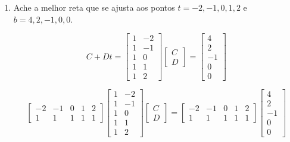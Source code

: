 \documentclass[leqno]{article}
\numberwithin{equation}{section}
\begin{document}
\begin{enumerate}
\begin{sol}
		\end{sol}
		
		
		\item Ache a melhor reta que se ajusta aos pontos $t = -2, -1, 0, 1, 2$ e $b = 4, 2, -1, 0, 0$.
		
		\begin{sol}
			
			$$C + Dt = \begin{bmatrix}
				1 & -2 \\
				1 & -1 \\
				1 & 0 \\
				1 & 1 \\ 
				1 & 2
			\end{bmatrix}\begin{bmatrix}
				C \\
				D
			\end{bmatrix} = \begin{bmatrix}
				4 \\
				2 \\
				-1 \\ 
				0 \\
				0
			\end{bmatrix}$$
		
		$$\begin{bmatrix}
			-2 & -1 & 0 & 1 & 2\\
			1 & 1 & 1 & 1 & 1
		\end{bmatrix}\begin{bmatrix}
			1 & -2 \\
			1 & -1 \\
			1 & 0 \\
			1 & 1 \\ 
			1 & 2
		\end{bmatrix}\begin{bmatrix}
			C \\
			D
		\end{bmatrix} = \begin{bmatrix}
		-2 & -1 & 0 & 1 & 2\\
		1 & 1 & 1 & 1 & 1
		\end{bmatrix}\begin{bmatrix}
			4 \\
			2 \\
			-1 \\ 
			0 \\
			0
		\end{bmatrix}$$
	

\end{sol}
\end{enumerate}
\end{document}
